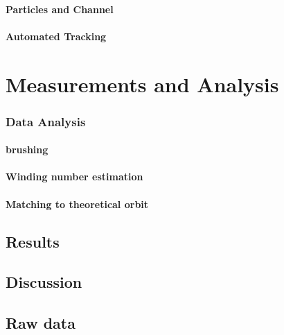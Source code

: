 \documentclass[]{report}
\begin{document}
\subsection{Particles and Channel}




\subsection{Automated Tracking}
     


\part{Measurements and Analysis}
\section{Data Analysis}


\subsection{brushing}


\subsection{Winding number estimation}


\subsection{Matching to theoretical orbit}


\chapter{Results}


\chapter{Discussion}

\appendix
\chapter{Raw data}
\end{document}
